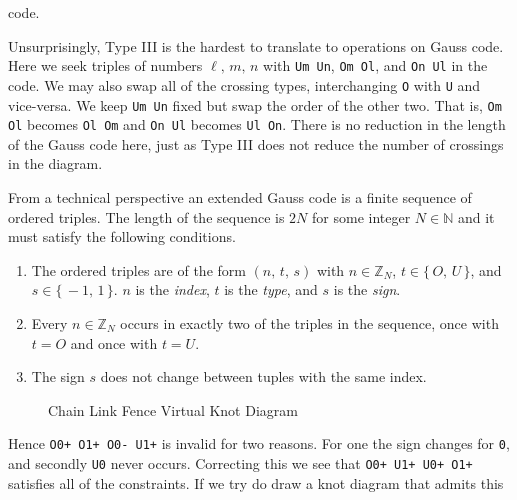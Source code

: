 \documentclass{article}
\theoremstyle{plain}
\begin{document}
        code.
        \par\hfill\par
        Unsurprisingly, Type III is the hardest to translate to operations on
        Gauss code. Here we seek triples of numbers
        $\ell,\,m,\,n$ with \texttt{Um Un}, \texttt{Om Ol},
        and \texttt{On Ul} in the code. We may also swap all of the crossing
        types, interchanging \texttt{O} with \texttt{U} and vice-versa.
        We keep \texttt{Um Un} fixed but swap the order of the other two.
        That is, \texttt{Om Ol} becomes \texttt{Ol Om} and
        \texttt{On Ul} becomes \texttt{Ul On}. There is no reduction in the
        length of the Gauss code here, just as Type III does not reduce the
        number of crossings in the diagram.
        \par\hfill\par
        From a technical perspective an extended Gauss code is a
        finite sequence of ordered triples. The length of the sequence is
        $2N$ for some integer $N\in\mathbb{N}$ and it must satisfy
        the following conditions.
        \begin{enumerate}
            \item
                The ordered triples are of the form $(n,\,t,\,s)$ with
                $n\in\mathbb{Z}_{N}$, $t\in\{\,O,\,U\,\}$, and
                $s\in\{\,-1,\,1\,\}$. $n$ is the \textit{index}, $t$ is the
                \textit{type}, and $s$ is the \textit{sign}.
            \item
                Every $n\in\mathbb{Z}_{N}$ occurs in exactly two of the
                triples in the sequence, once with $t=O$ and once with
                $t=U$.
            \item
                The sign $s$ does not change between tuples with the same
                index.
        \end{enumerate}
        \begin{figure}
            \centering
            \caption{Chain Link Fence Virtual Knot Diagram}
            \label{fig:chain_link_fence_knot_virtual}
        \end{figure}
        Hence \texttt{O0+ O1+ O0- U1+} is invalid for two reasons. For one
        the sign changes for \texttt{0}, and secondly \texttt{U0} never occurs.
        Correcting this we see that \texttt{O0+ U1+ U0+ O1+} satisfies all of
        the constraints. If we try do draw a knot diagram that admits this
\end{document}
